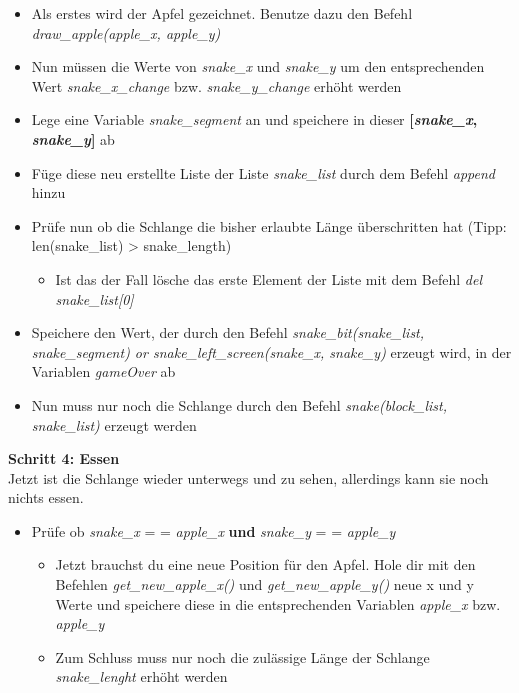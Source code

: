 \begin{itemize}
	\item Als erstes wird der Apfel gezeichnet. Benutze dazu den Befehl \textit{draw\_apple(apple\_x, apple\_y)}
	\item Nun müssen die Werte von \textit{snake\_x} und \textit{snake\_y} um den entsprechenden Wert \textit{snake\_x\_change} bzw. \textit{snake\_y\_change} erhöht werden
	\item Lege eine Variable \textit{snake\_segment} an und speichere in dieser \textbf{[\textit{snake\_x}, \textit{snake\_y}]} ab
	\item Füge diese neu erstellte Liste der Liste \textit{snake\_list} durch dem Befehl \textit{append} hinzu
	\item Prüfe nun ob die Schlange die bisher erlaubte Länge überschritten hat (Tipp: len(snake\_list) > snake\_length)
	\begin{itemize}
		\item Ist das der Fall lösche das erste Element der Liste mit dem Befehl \textit{del snake\_list[0]}
	\end{itemize}
	\item Speichere den Wert, der durch den Befehl \textit{snake\_bit(snake\_list, snake\_segment) or snake\_left\_screen(snake\_x, snake\_y)} erzeugt wird, in der Variablen \textit{gameOver} ab
	\item Nun muss nur noch die Schlange durch den Befehl \textit{snake(block\_list, snake\_list)} erzeugt werden
\end{itemize}
\textbf{Schritt 4: Essen}\\
Jetzt ist die Schlange wieder unterwegs und zu sehen, allerdings kann sie noch nichts essen.
\begin{itemize}
	\item Prüfe ob \textit{snake\_x} = = \textit{apple\_x} \textbf{und} \textit{snake\_y} = = \textit{apple\_y}
	\begin{itemize}
		\item Jetzt brauchst du eine neue Position für den Apfel. Hole dir mit den Befehlen \textit{get\_new\_apple\_x()} und \textit{get\_new\_apple\_y()} neue x und y Werte und speichere diese in die entsprechenden Variablen \textit{apple\_x} bzw. \textit{apple\_y}
		\item Zum Schluss muss nur noch die zulässige Länge der Schlange \textit{snake\_lenght} erhöht werden
	\end{itemize}	 
\end{itemize}